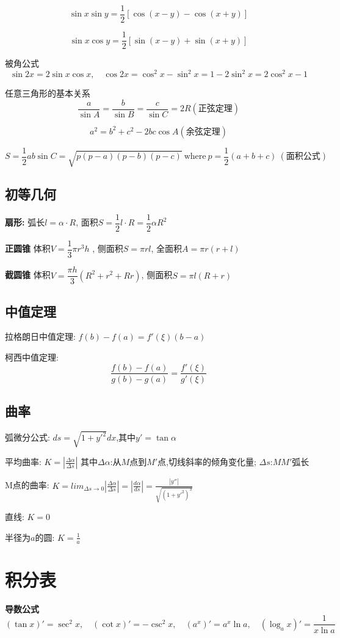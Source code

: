 \documentclass{book}
\begin{document}
$$
\sin x \sin y=\frac{ 1}{2}[\cos(x-y)-\cos(x+y)]
$$

$$
\sin x \cos y=\frac{ 1}{2}[\sin(x-y)+\sin(x+y)]
$$

被角公式
$$
\sin 2x=2\sin x \cos x,\quad \cos 2x=\cos^2 x-\sin ^2 x=1-2\sin^2 x=2\cos^2 x -1
$$

任意三角形的基本关系
$$
\frac{a}{\sin A}=
\frac{b}{\sin B}=
\frac{c}{\sin C}=
2R(\mbox{正弦定理})
$$

$$
a^2=b^2+c^2-2bc\cos A (\mbox{余弦定理})
$$

$$
S= \frac{ 1}{2}ab\sin C=\sqrt{p(p-a)(p-b)(p-c)}~\mbox{where}~p=\frac{1}{2}(a+b+c)~ (\mbox{面积公式})
$$

\subsection{初等几何}
\textbf{扇形:}
弧长$l=\alpha \cdot R$, \quad
面积$S=\dfrac{1}{2}l\cdot R=\dfrac{1}{2}\alpha R^2$

\textbf{正圆锥}
体积$V=\dfrac{1}{3}\pi r^3 h$ , \quad
侧面积$S=\pi rl$, \quad
全面积$A=\pi r(r+l)$

\textbf{截圆锥}
体积$V=\dfrac{\pi h}{3}(R^2+r^2+Rr)$, \quad
侧面积$S=\pi l(R+r)$

\subsection{中值定理}
拉格朗日中值定理: $f(b)-f(a)=f'(\xi)(b-a)$

柯西中值定理: $$\frac{f(b)-f(a)}{g(b)-g(a)}=\frac{f'(\xi) }{g'(\xi)}$$
\subsection{曲率}
弧微分公式: $ds=\sqrt{1+y'^2}dx$,其中$y'=\tan \alpha$

平均曲率: $K=|\frac{\Delta\alpha}{\Delta s}|$ 其中$\Delta \alpha$:从$M$点到$M'$点,切线斜率的倾角变化量; $\Delta s$:$MM'$弧长

M点的曲率: $K=lim_{\Delta s \to 0}|\frac{\Delta\alpha}{\Delta s}|=|\frac{d \alpha}{ds}|=\frac{|y''|}{\sqrt{(1+y'^2)^3}}$

直线: $K=0$

半径为$a$的圆: $K=\frac{1}{a}$

\section{积分表}
\textbf{导数公式}
$$
(\tan x)'=\sec ^2 x,\quad
(\cot x)'=-\csc^2 x,\quad
(a^x)'=a^x\ln a,\quad
(\log_a x)'=\frac{1}{x \ln a}
$$
\end{document}
